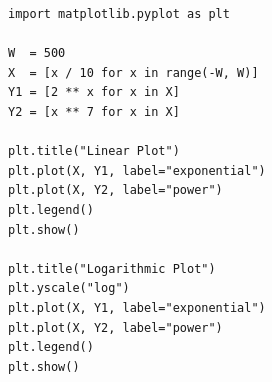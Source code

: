 \begin{frame}[fragile]
%
\begin{codebox}
\begin{verbatim}
import matplotlib.pyplot as plt

W  = 500
X  = [x / 10 for x in range(-W, W)]
Y1 = [2 ** x for x in X]
Y2 = [x ** 7 for x in X]

plt.title("Linear Plot")
plt.plot(X, Y1, label="exponential")
plt.plot(X, Y2, label="power")
plt.legend()
plt.show()

plt.title("Logarithmic Plot")
plt.yscale("log")
plt.plot(X, Y1, label="exponential")
plt.plot(X, Y2, label="power")
plt.legend()
plt.show()
\end{verbatim}
\end{codebox}
%
\end{frame}


